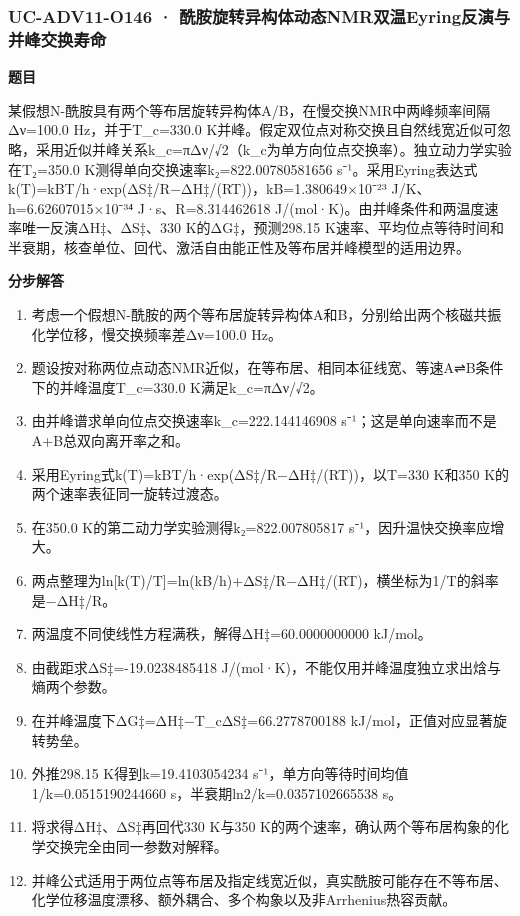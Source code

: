 \documentclass[UTF8,11pt,a4paper]{ctexart}
\begin{document}
\subsubsection*{UC-ADV11-O146 · 酰胺旋转异构体动态NMR双温Eyring反演与并峰交换寿命}
\noindent\textbf{题目}\par
某假想N-酰胺具有两个等布居旋转异构体A/B，在慢交换NMR中两峰频率间隔Δν=100.0 Hz，并于T\_c=330.0 K并峰。假定双位点对称交换且自然线宽近似可忽略，采用近似并峰关系k\_c=πΔν/√2（k\_c为单方向位点交换率）。独立动力学实验在T₂=350.0 K测得单向交换速率k₂=822.00780581656 s⁻¹。采用Eyring表达式k(T)=kBT/h·exp(ΔS‡/R−ΔH‡/(RT))，kB=1.380649×10⁻²³ J/K、h=6.62607015×10⁻³⁴ J·s、R=8.314462618 J/(mol·K)。由并峰条件和两温度速率唯一反演ΔH‡、ΔS‡、330 K的ΔG‡，预测298.15 K速率、平均位点等待时间和半衰期，核查单位、回代、激活自由能正性及等布居并峰模型的适用边界。\par
\medskip\noindent\textbf{分步解答}
\begin{enumerate}
\item 考虑一个假想N-酰胺的两个等布居旋转异构体A和B，分别给出两个核磁共振化学位移，慢交换频率差Δν=100.0 Hz。
\item 题设按对称两位点动态NMR近似，在等布居、相同本征线宽、等速A⇌B条件下的并峰温度T\_c=330.0 K满足k\_c=πΔν/√2。
\item 由并峰谱求单向位点交换速率k\_c=222.144146908 s⁻¹；这是单向速率而不是A+B总双向离开率之和。
\item 采用Eyring式k(T)=kBT/h·exp(ΔS‡/R−ΔH‡/(RT))，以T=330 K和350 K的两个速率表征同一旋转过渡态。
\item 在350.0 K的第二动力学实验测得k₂=822.007805817 s⁻¹，因升温快交换率应增大。
\item 两点整理为ln[k(T)/T]=ln(kB/h)+ΔS‡/R−ΔH‡/(RT)，横坐标为1/T的斜率是−ΔH‡/R。
\item 两温度不同使线性方程满秩，解得ΔH‡=60.0000000000 kJ/mol。
\item 由截距求ΔS‡=-19.0238485418 J/(mol·K)，不能仅用并峰温度独立求出焓与熵两个参数。
\item 在并峰温度下ΔG‡=ΔH‡−T\_cΔS‡=66.2778700188 kJ/mol，正值对应显著旋转势垒。
\item 外推298.15 K得到k=19.4103054234 s⁻¹，单方向等待时间均值1/k=0.0515190244660 s，半衰期ln2/k=0.0357102665538 s。
\item 将求得ΔH‡、ΔS‡再回代330 K与350 K的两个速率，确认两个等布居构象的化学交换完全由同一参数对解释。
\item 并峰公式适用于两位点等布居及指定线宽近似，真实酰胺可能存在不等布居、化学位移温度漂移、额外耦合、多个构象以及非Arrhenius热容贡献。
\end{enumerate}
\end{document}
